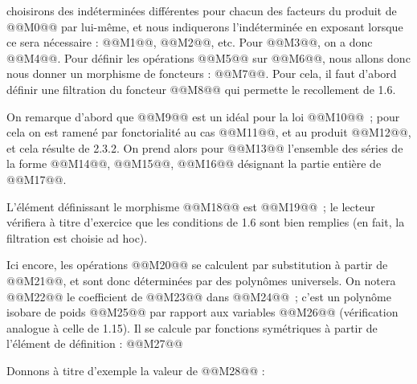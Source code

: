 
choisirons des indéterminées différentes pour chacun des facteurs du produit de @@M0@@ par lui-même, et nous indiquerons l'indéterminée en exposant lorsque ce sera nécessaire : @@M1@@, @@M2@@, etc. Pour @@M3@@, on a donc @@M4@@. Pour définir les opérations @@M5@@ sur @@M6@@, nous allons donc nous donner un morphisme de foncteurs : @@M7@@.
Pour cela, il faut d'abord définir une filtration du foncteur @@M8@@ qui permette le recollement de 1.6.

On remarque d'abord que @@M9@@ est un idéal pour la loi @@M10@@~; pour cela on est ramené par fonctorialité au cas @@M11@@, et au produit @@M12@@, et cela résulte de 2.3.2. On prend alors pour @@M13@@ l'ensemble des séries de la forme @@M14@@, @@M15@@, @@M16@@ désignant la partie entière de @@M17@@.

L'élément définissant le morphisme @@M18@@ est @@M19@@~; le lecteur vérifiera à titre d'exercice que les conditions de 1.6 sont bien remplies (en fait, la filtration est choisie ad hoc).

Ici encore, les opérations @@M20@@ se calculent par substitution à partir de @@M21@@, et sont donc déterminées par des polynômes universels. On notera @@M22@@ le coefficient de @@M23@@ dans @@M24@@~; c'est un polynôme isobare de poids @@M25@@ par rapport aux variables @@M26@@ (vérification analogue à celle de 1.15). Il se calcule par fonctions symétriques à partir de l'élément de définition :
@@M27@@

Donnons à titre d'exemple la valeur de @@M28@@ :
